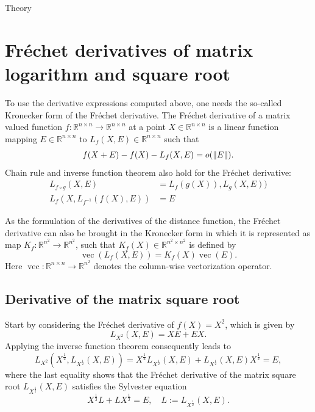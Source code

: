 \begin{chapter}{Theory}
\section{Fr\'{e}chet derivatives of matrix logarithm and square root} %
\label{sec:frechetderivatives}
To use the derivative expressions computed above, one needs the so-called Kronecker form of the Fr\'{e}chet derivative. The Fr\'{e}chet derivative
of a matrix valued function $f:\mathbb{R}^{n\times n}\to\mathbb{R}^{n\times n}$ at a point $X\in\mathbb{R}^{n\times n}$ is a linear function mapping $E\in\mathbb{R}^{n\times n}$
to $L_f(X,E)\in \mathbb{R}^{n\times n}$ such that
\begin{equation}
    f(X+E) - f(X) - L_f(X,E) = o(\| E \|).
\end{equation}
Chain rule and inverse function theorem also hold for the Fr\'{e}chet derivative:
\begin{align}
    L_{f\circ g}(X, E) &= L_{f}(g(X)),L_{g}(X,E))\\
    L_{f}(X, L_{f^{-1}}(f(X),E)) &= E
\end{align}

As the formulation of the derivatives of the distance function, the Fr\'{e}chet derivative can also be brought in the Kronecker form in which it is represented as map
$K_f:\mathbb{R}^{n^2}\to\mathbb{R}^{n^2}$, such that $K_f(X)\in \mathbb{R}^{n^2\times n^2}$ is defined by
\begin{equation}
    \label{eq:kronckerform}
    \operatorname{vec}(L_f(X,E))=K_f(X)\operatorname{vec}(E).
\end{equation}
Here $\operatorname{vec}:\mathbb{R}^{n\times n}\to\mathbb{R}^{n^2}$ denotes the column-wise vectorization operator.

\subsection{Derivative of the matrix square root} %
\label{sub:Derivative of the matrix square root}
Start by considering the Fr\'{e}chet derivative of $f(X)=X^2$, which is given by
\begin{equation}
    L_{X^2}(X,E) = XE + EX.
\end{equation}
Applying the inverse function theorem consequently leads to
\begin{equation}
    L_{X^2}(X^{\frac{1}{2}},L_{X^{\frac{1}{2}}}(X,E))=X^{\frac{1}{2}}L_{X^{\frac{1}{2}}}(X,E) + L_{X^{\frac{1}{2}}}(X,E)X^{\frac{1}{2}} = E,
\end{equation}
where the last equality shows that the Fr\'{e}chet derivative of the matrix square root $L_{X^{\frac{1}{2}}}(X,E)$ satisfies the Sylvester equation 
\begin{equation}
    \label{eq:sylvester}
    X^{\frac{1}{2}}L + LX^{\frac{1}{2}} = E,\quad L:=L_{X^{\frac{1}{2}}}(X,E).
\end{equation}


\end{chapter}
